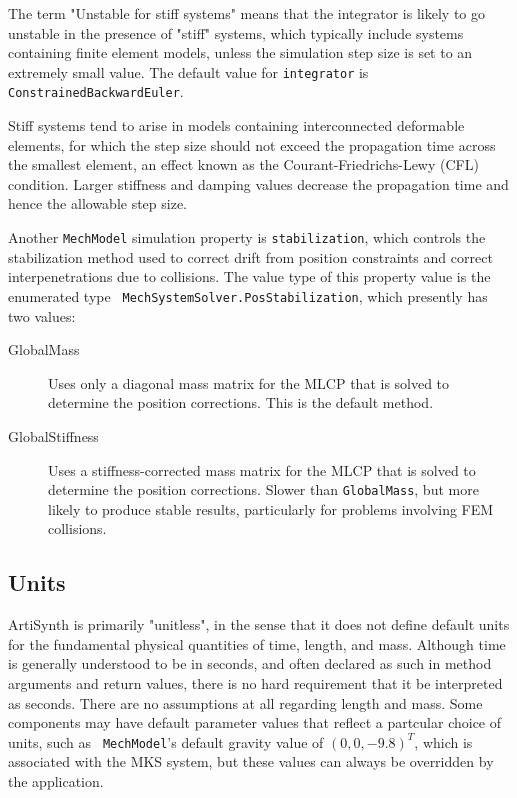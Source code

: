 The term "Unstable for stiff systems" means that the integrator is
likely to go unstable in the presence of "stiff" systems, which
typically include systems containing finite element models, unless the
simulation step size is set to an extremely small value.  The default
value for {\tt integrator} is {\tt ConstrainedBackwardEuler}.

\begin{sideblock}
Stiff systems tend to arise in models containing interconnected
deformable elements, for which the step size should not exceed the
propagation time across the smallest element, an effect known as the
Courant-Friedrichs-Lewy (CFL) condition. Larger stiffness and damping
values decrease the propagation time and hence the allowable step
size.
\end{sideblock}

Another {\tt MechModel} simulation property is {\tt stabilization},
which controls the stabilization method used to correct drift from
position constraints and correct interpenetrations due to collisions.
The value type of this property value is the enumerated type {\tt
MechSystemSolver.PosStabilization}, which presently has two values:

\begin{description}

\item[GlobalMass]\mbox{}

Uses only a diagonal mass matrix for the MLCP that is solved to
determine the position corrections. This is the default method.

\item[GlobalStiffness]\mbox{}

Uses a stiffness-corrected mass matrix for the MLCP that is solved to
determine the position corrections. Slower than {\tt GlobalMass}, but
more likely to produce stable results, particularly for
problems involving FEM collisions.

\end{description}

\subsection{Units}

ArtiSynth is primarily "unitless", in the sense that it does not
define default units for the fundamental physical quantities of time,
length, and mass. Although time is
generally understood to be in seconds, and often declared as such in
method arguments and return values, there is no hard requirement that
it be interpreted as seconds. There are no assumptions at all
regarding length and mass. Some components may have default parameter
values that reflect a partcular choice of units, such as {\tt
MechModel}'s default gravity value of $(0, 0, -9.8)^T$, which is
associated with the MKS system, but these values can always be
overridden by the application.

